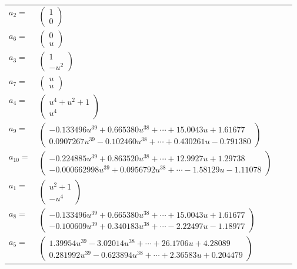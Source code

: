 \documentclass[1p]{elsarticle_modified}
\theoremstyle{definition}
\begin{document}
\begin{tabular}{m{7pt} m{180pt} m{7pt} m{180pt} }
\flushright $a_{2}=$&$\begin{pmatrix}1\\0\end{pmatrix}$ \\
\flushright $a_{6}=$&$\begin{pmatrix}0\\u\end{pmatrix}$ \\
\flushright $a_{3}=$&$\begin{pmatrix}1\\- u^2\end{pmatrix}$ \\
\flushright $a_{7}=$&$\begin{pmatrix}u\\u\end{pmatrix}$ \\
\flushright $a_{4}=$&$\begin{pmatrix}u^4+u^2+1\\u^4\end{pmatrix}$ \\
\flushright $a_{9}=$&$\begin{pmatrix}-0.133496 u^{39}+0.665380 u^{38}+\cdots+15.0043 u+1.61677\\0.0907267 u^{39}-0.102460 u^{38}+\cdots+0.430261 u-0.791380\end{pmatrix}$ \\
\flushright $a_{10}=$&$\begin{pmatrix}-0.224885 u^{39}+0.863520 u^{38}+\cdots+12.9927 u+1.29738\\-0.000662998 u^{39}+0.0956792 u^{38}+\cdots-1.58129 u-1.11078\end{pmatrix}$ \\
\flushright $a_{1}=$&$\begin{pmatrix}u^2+1\\- u^4\end{pmatrix}$ \\
\flushright $a_{8}=$&$\begin{pmatrix}-0.133496 u^{39}+0.665380 u^{38}+\cdots+15.0043 u+1.61677\\-0.100609 u^{39}+0.340183 u^{38}+\cdots-2.22497 u-1.18977\end{pmatrix}$ \\
\flushright $a_{5}=$&$\begin{pmatrix}1.39954 u^{39}-3.02014 u^{38}+\cdots+26.1706 u+4.28089\\0.281992 u^{39}-0.623894 u^{38}+\cdots+2.36583 u+0.204479\end{pmatrix}$ \\

\end{tabular}
\end{document}
